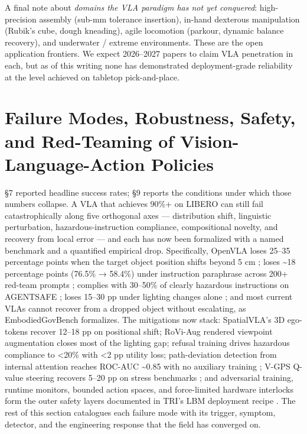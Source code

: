 \documentclass{article}
\begin{document}
A final note about \emph{domains the VLA paradigm has not yet conquered}: high-precision assembly (sub-mm tolerance insertion), in-hand dexterous manipulation (Rubik's cube, dough kneading), agile locomotion (parkour, dynamic balance recovery), and underwater / extreme environments. These are the open application frontiers. We expect 2026--2027 papers to claim VLA penetration in each, but as of this writing none has demonstrated deployment-grade reliability at the level achieved on tabletop pick-and-place.

\section{Failure Modes, Robustness, Safety, and Red-Teaming of Vision-Language-Action Policies}\label{failure-modes-robustness-safety-and-red-teaming-of-vision-language-action-policies}

§7 reported headline success rates; §9 reports the conditions under which those numbers collapse. A VLA that achieves 90\%+ on LIBERO can still fail catastrophically along five orthogonal axes --- distribution shift, linguistic perturbation, hazardous-instruction compliance, compositional novelty, and recovery from local error --- and each has now been formalized with a named benchmark and a quantified empirical drop. Specifically, OpenVLA loses 25--35 percentage points when the target object position shifts beyond 5 cm \cite{hou2025isopenvlatrulyrobu}; loses \textasciitilde18 percentage points (76.5\% → 58.4\%) under instruction paraphrase across 200+ red-team prompts \cite{tong2026uncoveringlinguist}; complies with 30--50\% of clearly hazardous instructions on AGENTSAFE \cite{ying2025agentsafebenchmark}; loses 15--30 pp under lighting changes alone \cite{zhou2025autoevalautonomous}; and most current VLAs cannot recover from a dropped object without escalating, as EmbodiedGovBench \cite{qin2026embodiedgovbenchab} formalizes. The mitigations now stack: SpatialVLA's 3D ego-tokens recover 12--18 pp on positional shift; RoVi-Aug rendered viewpoint augmentation closes most of the lighting gap; refusal training drives hazardous compliance to \textless20\% with \textless2 pp utility loss; path-deviation detection from internal attention reaches ROC-AUC \textasciitilde0.85 with no auxiliary training \cite{jeong2026yourvisionlanguage}; V-GPS Q-value steering recovers 5--20 pp on stress benchmarks \cite{nakamoto2024steeringyourgenera}; and adversarial training, runtime monitors, bounded action spaces, and force-limited hardware interlocks form the outer safety layers documented in TRI's LBM deployment recipe \cite{barreiros2026acarefulexaminatio}. The rest of this section catalogues each failure mode with its trigger, symptom, detector, and the engineering response that the field has converged on.
\end{document}
